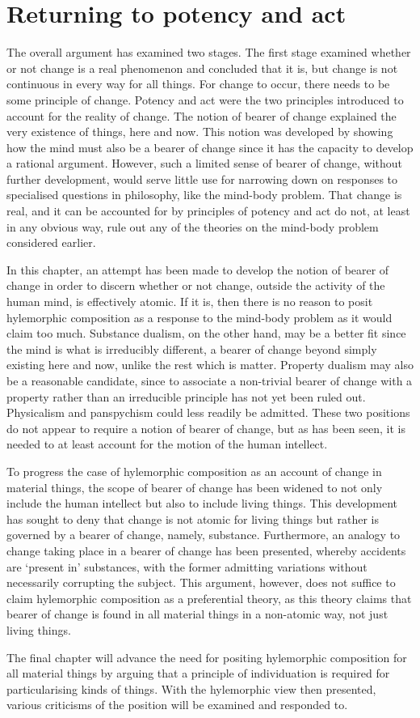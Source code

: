\section{Returning to potency and act}

The overall argument has examined two stages. The first stage examined whether or not change is a real phenomenon and concluded that it is, but change is not continuous in every way for all things. For change to occur, there needs to be some principle of change. Potency and act were the two principles introduced to account for the reality of change. The notion of bearer of change explained the very existence of things, here and now. This notion was developed by showing how the mind must also be a bearer of change since it has the capacity to develop a rational argument. However, such a limited sense of bearer of change, without further development, would serve little use for narrowing down on responses to specialised questions in philosophy, like the mind-body problem. That change is real, and it can be accounted for by principles of potency and act do not, at least in any obvious way, rule out any of the theories on the mind-body problem considered earlier.

In this chapter, an attempt has been made to develop the notion of bearer of change in order to discern whether or not change, outside the activity of the human mind, is effectively atomic. If it is, then there is no reason to posit hylemorphic composition as a response to the mind-body problem as it would claim too much. Substance dualism, on the other hand, may be a better fit since the mind is what is irreducibly different, a bearer of change beyond simply existing here and now, unlike the rest which is matter. Property dualism may also be a reasonable candidate, since to associate a non-trivial bearer of change with a property rather than an irreducible principle has not yet been ruled out. Physicalism and panspychism could less readily be admitted. These two positions do not appear to require a notion of bearer of change, but as has been seen, it is needed to at least account for the motion of the human intellect.

To progress the case of hylemorphic composition as an account of change in material things, the scope of bearer of change has been widened to not only include the human intellect but also to include living things. This development has sought to deny that change is not atomic for living things but rather is governed by a bearer of change, namely, substance. Furthermore, an analogy to change taking place in a bearer of change has been presented, whereby accidents are `present in' substances, with the former admitting variations without necessarily corrupting the subject. This argument, however, does not suffice to claim hylemorphic composition as a preferential theory, as this theory claims that bearer of change is found in all material things in a non-atomic way, not just living things.

The final chapter will advance the need for positing hylemorphic composition for all material things by arguing that a principle of individuation is required for particularising kinds of things. With the hylemorphic view then presented, various criticisms of the position will be examined and responded to.
